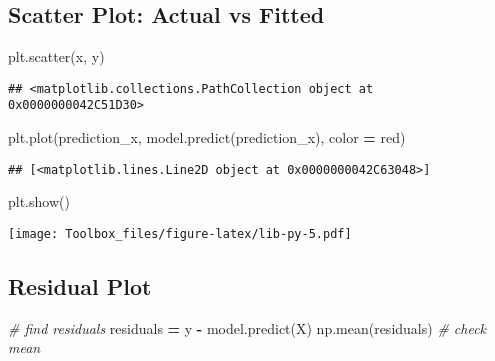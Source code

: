 \documentclass[
]{book}
\newenvironment{Shaded}{\begin{snugshade}}{\end{snugshade}}
\newcommand{\CommentTok}[1]{\textcolor[rgb]{0.56,0.35,0.01}{\textit{#1}}}
\newcommand{\NormalTok}[1]{#1}
\newcommand{\OperatorTok}[1]{\textcolor[rgb]{0.81,0.36,0.00}{\textbf{#1}}}
\newcommand{\StringTok}[1]{\textcolor[rgb]{0.31,0.60,0.02}{#1}}
\begin{document}
\hypertarget{scatter-plot-actual-vs-fitted}{%
\subsection{Scatter Plot: Actual vs Fitted}\label{scatter-plot-actual-vs-fitted}}

\begin{Shaded}
\begin{Highlighting}[]
\NormalTok{plt.scatter(x, y)}
\end{Highlighting}
\end{Shaded}

\begin{verbatim}
## <matplotlib.collections.PathCollection object at 0x0000000042C51D30>
\end{verbatim}

\begin{Shaded}
\begin{Highlighting}[]
\NormalTok{plt.plot(prediction\_x, model.predict(prediction\_x), color }\OperatorTok{=} \StringTok{\textquotesingle{}red\textquotesingle{}}\NormalTok{)}
\end{Highlighting}
\end{Shaded}

\begin{verbatim}
## [<matplotlib.lines.Line2D object at 0x0000000042C63048>]
\end{verbatim}

\begin{Shaded}
\begin{Highlighting}[]
\NormalTok{plt.show()}
\end{Highlighting}
\end{Shaded}

\texttt{[image: Toolbox\_files/figure-latex/lib-py-5.pdf]}

\hypertarget{residual-plot}{%
\subsection{Residual Plot}\label{residual-plot}}

\begin{Shaded}
\begin{Highlighting}[]
\CommentTok{\# find residuals}
\NormalTok{residuals }\OperatorTok{=}\NormalTok{ y }\OperatorTok{{-}}\NormalTok{ model.predict(X)}
\NormalTok{np.mean(residuals) }\CommentTok{\# check mean}
\end{Highlighting}
\end{Shaded}
\end{document}
